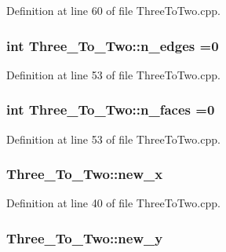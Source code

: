 Definition at line 60 of file Three\+To\+Two.\+cpp.

\subsubsection[{\texorpdfstring{n\+\_\+edges}{n_edges}}]{\setlength{\rightskip}{0pt plus 5cm}int Three\+\_\+\+To\+\_\+\+Two\+::n\+\_\+edges =0}\hypertarget{class_three___to___two_a42a8bb1919cbeaa1a717ecea05468493}{}\label{class_three___to___two_a42a8bb1919cbeaa1a717ecea05468493}


Definition at line 53 of file Three\+To\+Two.\+cpp.

\subsubsection[{\texorpdfstring{n\+\_\+faces}{n_faces}}]{\setlength{\rightskip}{0pt plus 5cm}int Three\+\_\+\+To\+\_\+\+Two\+::n\+\_\+faces =0}\hypertarget{class_three___to___two_aef5084fad08c5eeac58437d90113122f}{}\label{class_three___to___two_aef5084fad08c5eeac58437d90113122f}


Definition at line 53 of file Three\+To\+Two.\+cpp.

\subsubsection[{\texorpdfstring{new\+\_\+x}{new_x}}]{ Three\+\_\+\+To\+\_\+\+Two\+::new\+\_\+x}\hypertarget{class_three___to___two_a5e20357c42384b2e7aecfdf88ccbd898}{}\label{class_three___to___two_a5e20357c42384b2e7aecfdf88ccbd898}


Definition at line 40 of file Three\+To\+Two.\+cpp.

\subsubsection[{\texorpdfstring{new\+\_\+y}{new_y}}]{ Three\+\_\+\+To\+\_\+\+Two\+::new\+\_\+y}\hypertarget{class_three___to___two_a6d516a8a5fa8b8ee2dd1c64195725ab7}{}\label{class_three___to___two_a6d516a8a5fa8b8ee2dd1c64195725ab7}


